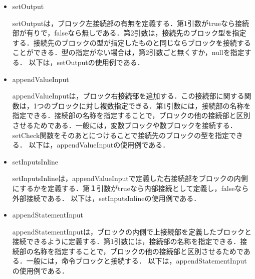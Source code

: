 \documentclass{risepaper}
\begin{document}
\begin{itemize}
\item setOutput

setOutputは，ブロック左接続部の有無を定義する．第1引数がtrueなら接続部が有りで，falseなら無しである．第2引数は，接続先のブロック型を指定する．接続先のブロックの型が指定したものと同じならブロックを接続することができる．型の指定がない場合は，第2引数ごと無くすか，nullを指定する．
以下は，setOutputの使用例である．


\item appendValueInput

appendValueInputは，ブロック右接続部を追加する．この接続部に関する関数は，1つのブロックに対し複数指定できる．第1引数には，接続部の名称を指定できる．接続部の名称を指定することで，ブロックの他の接続部と区別させるためである．一般には，変数ブロックや数ブロックを接続する．setCheck関数をそのあとにつけることで接続先のブロックの型を指定できる．
以下は，appendValueInputの使用例である．


\item setInputsInline

setInputsInlineは，appendValueInputで定義した右接続部をブロックの内側にするかを定義する．第１引数がtrueなら内部接続として定義し，falseなら外部接続である．
以下は，setInputsInlineの使用例である．


\item appendStatementInput

appendStatementInputは，ブロックの内側で上接続部を定義したブロックと接続できるように定義する．第1引数には，接続部の名称を指定できる．接続部の名称を指定することで，ブロックの他の接続部と区別させるためである．一般には，命令ブロックと接続する．
以下は，appendStatementInputの使用例である．


\end{itemize}
\end{document}
